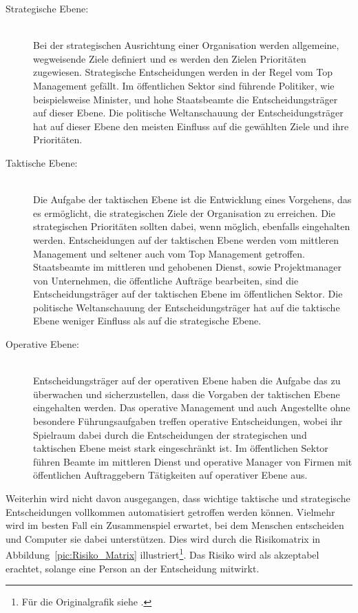 \begin{description}

\item[Strategische Ebene:] \hfill \\
Bei der strategischen Ausrichtung einer Organisation werden allgemeine, wegweisende Ziele definiert
und es werden den Zielen Prioritäten zugewiesen. Strategische Entscheidungen werden in 
der Regel vom Top Management gefällt. Im öffentlichen Sektor sind führende Politiker, 
wie beispielsweise Minister, und hohe Staatsbeamte die Entscheidungsträger auf dieser Ebene.
Die politische Weltanschauung der Entscheidungsträger hat auf dieser Ebene den 
meisten Einfluss auf die gewählten Ziele und ihre Prioritäten.

\item[Taktische Ebene:] \hfill \\
Die Aufgabe der taktischen Ebene ist die Entwicklung eines Vorgehens, das es
ermöglicht, die strategischen Ziele der Organisation zu erreichen. Die strategischen
Prioritäten sollten dabei, wenn möglich, ebenfalls eingehalten werden. Entscheidungen
auf der taktischen Ebene werden vom mittleren Management und seltener auch vom Top
Management getroffen. Staatsbeamte im mittleren und gehobenen Dienst, sowie Projektmanager von
Unternehmen, die öffentliche Aufträge bearbeiten, sind die Entscheidungsträger auf der taktischen
Ebene im öffentlichen Sektor. Die politische Weltanschauung der Entscheidungsträger hat 
auf die taktische Ebene weniger Einfluss als auf die strategische Ebene. 

\item[Operative Ebene:] \hfill \\
Entscheidungsträger auf der operativen Ebene haben die Aufgabe das \grqq{}
zu überwachen und sicherzustellen, dass die Vorgaben der taktischen Ebene eingehalten werden.
Das operative Management und auch Angestellte ohne besondere Führungsaufgaben treffen operative
Entscheidungen, wobei ihr Spielraum dabei durch die Entscheidungen der strategischen und taktischen
Ebene meist stark eingeschränkt ist. Im öffentlichen Sektor führen Beamte im mittleren Dienst und 
operative Manager von Firmen mit öffentlichen Auftraggebern Tätigkeiten auf operativer Ebene aus.

\end{description}

Weiterhin wird nicht davon ausgegangen, dass wichtige taktische und strategische Entscheidungen
vollkommen automatisiert getroffen werden können. Vielmehr wird im besten Fall ein Zusammenspiel
erwartet, bei dem Menschen entscheiden und Computer sie dabei unterstützen. Dies wird durch
die Risikomatrix in Abbildung~\ref{pic:Risiko_Matrix} illustriert\footnote{
Für die Originalgrafik siehe \cite{Watson}.
}. Das Risiko wird als akzeptabel erachtet, solange eine Person an der Entscheidung mitwirkt.

